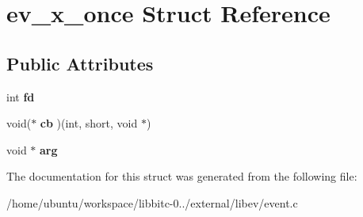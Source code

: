 \hypertarget{structev__x__once}{\section{ev\-\_\-x\-\_\-once Struct Reference}
\label{structev__x__once}
}
\subsection*{Public Attributes}
\begin{DoxyCompactItemize}
\item 
\hypertarget{structev__x__once_ad8bab46828192f0962c4c5b523cff7ef}{int {\bfseries fd}}\label{structev__x__once_ad8bab46828192f0962c4c5b523cff7ef}

\item 
\hypertarget{structev__x__once_a65af661a9a3718ff8deaafb266791355}{void($\ast$ {\bfseries cb} )(int, short, void $\ast$)}\label{structev__x__once_a65af661a9a3718ff8deaafb266791355}

\item 
\hypertarget{structev__x__once_a982a915afeeacdbcf2612bd6da70a2eb}{void $\ast$ {\bfseries arg}}\label{structev__x__once_a982a915afeeacdbcf2612bd6da70a2eb}

\end{DoxyCompactItemize}


The documentation for this struct was generated from the following file\-:\begin{DoxyCompactItemize}
\item 
/home/ubuntu/workspace/libbitc-\/0../external/libev/event.\-c\end{DoxyCompactItemize}

